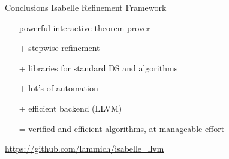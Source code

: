 \documentclass[fleqn]{beamer}
\begin{document}
\begin{frame}{Conclusions}
  Isabelle Refinement Framework
    \begin{itemize}
     \item[{}] powerful interactive theorem prover
     \item[+] stepwise refinement
     \item[+] libraries for standard DS and algorithms
     \item[+] lot's of automation
     \item[+] efficient backend (LLVM)
     \item[=] verified and efficient algorithms, at manageable effort

    \end{itemize}
  \vfill

  \url{https://github.com/lammich/isabelle_llvm}








%
%
%
%
%
%
%





\end{frame}
\end{document}
